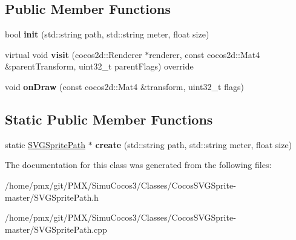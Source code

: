 \subsection*{Public Member Functions}
\begin{DoxyCompactItemize}
\item 
\mbox{\label{classSVGSpritePath_a5285e4ff3c5b07831af15e4ed9727303}} 
bool {\bfseries init} (std\+::string path, std\+::string meter, float size)
\item 
\mbox{\label{classSVGSpritePath_a241e92e1d742bbf45cf37e26551c0d57}} 
virtual void {\bfseries visit} (cocos2d\+::\+Renderer $\ast$renderer, const cocos2d\+::\+Mat4 \&parent\+Transform, uint32\+\_\+t parent\+Flags) override
\item 
\mbox{\label{classSVGSpritePath_ac30c629c991c2433869020df65541023}} 
void {\bfseries on\+Draw} (const cocos2d\+::\+Mat4 \&transform, uint32\+\_\+t flags)
\end{DoxyCompactItemize}
\subsection*{Static Public Member Functions}
\begin{DoxyCompactItemize}
\item 
\mbox{\label{classSVGSpritePath_adeca8ea97d8e56838608b7a8e4bd71b4}} 
static \hyperlink{classSVGSpritePath}{S\+V\+G\+Sprite\+Path} $\ast$ {\bfseries create} (std\+::string path, std\+::string meter, float size)
\end{DoxyCompactItemize}


The documentation for this class was generated from the following files\+:\begin{DoxyCompactItemize}
\item 
/home/pmx/git/\+P\+M\+X/\+Simu\+Cocos3/\+Classes/\+Cocos\+S\+V\+G\+Sprite-\/master/S\+V\+G\+Sprite\+Path.\+h\item 
/home/pmx/git/\+P\+M\+X/\+Simu\+Cocos3/\+Classes/\+Cocos\+S\+V\+G\+Sprite-\/master/S\+V\+G\+Sprite\+Path.\+cpp\end{DoxyCompactItemize}
